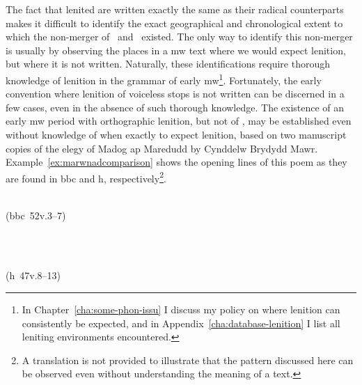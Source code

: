 The fact that lenited  are written exactly the same as their radical counterparts makes it difficult to identify the exact geographical and chronological extent to which the non-merger of \xD\ and \lT\ existed. The only way to identify this non-merger is usually by observing the places in a \gls{mw} text where we would expect lenition, but where it is not written. Naturally, these identifications require thorough knowledge of lenition in  the grammar of early \gls{mw}\footnote{In Chapter~\ref{cha:some-phon-issu} I discuss my policy on where lenition can consistently be expected, and in Appendix~\ref{cha:database-lenition} I  list all leniting environments encountered.}. Fortunately, the early convention where lenition of voiceless stops is not written can be discerned in a few cases, even in the absence of such thorough knowledge. The existence of an early \gls{mw} period with orthographic lenition, but  not of \lT, may be established even without knowledge of when exactly to expect lenition, based on two manuscript copies of the elegy of Madog ap Maredudd  by Cynddelw Brydydd Mawr. Example~\ref{ex:marwnadcomparison} shows the opening lines of this poem as they are found in \gls{bbc}  and \gls{h}, respectively\footnote{A translation is not provided to illustrate that the pattern discussed here can be observed even without understanding the meaning of a text.}.
\begin{mwl}
\item%
  \begin{minipage}[t]{0.45\textwidth}
    \\
    (\acrshort{bbc}~52v.3--7)
  \end{minipage}~
  \begin{minipage}[t]{0.45\textwidth}
    \\
    (\acrshort{h}~47v.8--13)
  \end{minipage}
  \label{ex:marwnadcomparison}
\end{mwl}
